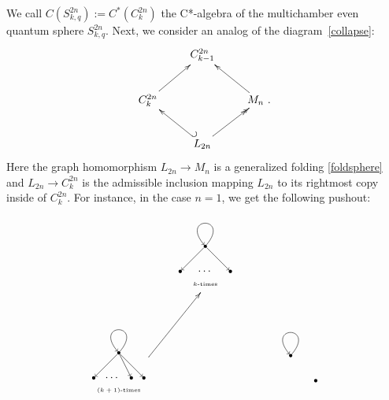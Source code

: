 \documentclass[12pt,times,a4paper]{amsart}
\numberwithin{equation}{section}
\numberwithin{equation}{section}
\begin{document}
\noindent We call $C(S^{2n}_{k,q}):=C^*(C^{2n}_k)$ the C*-algebra of the multichamber even quantum sphere $S^{2n}_{k,q}$. Next, we consider an analog of the diagram~\eqref{collapse}:
\begin{equation}
\xymatrix{
& C_{k-1}^{2n} &\\
C_k^{2n} \ar[ur] & & M_{n}~. \ar[ul]\\
& L_{2n} \ar@{>>}[ur] \ar@{_{(}->}[ul] &
}
\end{equation}
Here the graph homomorphism $L_{2n}\to M_n$ is a generalized folding \eqref{foldsphere} and $L_{2n}\to C^{2n}_k$ is the admissible inclusion mapping $L_{2n}$ to its rightmost copy inside of $C^{2n}_k$.
For instance, in the case $n=1$, we get the following pushout:
\begin{equation}
\begin{gathered}
\xymatrix{
&
\begin{tikzpicture}[scale=0.4,auto,swap]
\centering
\tikzstyle{vertex}=[circle,fill=black,minimum size=3pt,inner sep=0pt]
\tikzstyle{edge}=[draw,->]
    \node[vertex] (2) at (0,0) {};
    \node[vertex] (4) at (-2,-2) {};
    \node[vertex] (5) at (2,-2) {};
    \node (6) at (0,-2) {$\cdots$};
    \node (7) at (0,-3) {{\tiny $k$-times}};
    \path (2) edge [edge, anchor=center, loop above,min distance=20mm,in=130,out=50,looseness=40] node {} (2);
    \path (2) edge [edge] node {} (4);
    \path (2) edge [edge] node {} (5);
\end{tikzpicture}
&\\
\begin{tikzpicture}[scale=0.4,auto,swap]
\centering
\tikzstyle{vertex}=[circle,fill=black,minimum size=3pt,inner sep=0pt]
\tikzstyle{edge}=[draw,->]
    \node[vertex] (2) at (0,0) {};
    \node[vertex] (4) at (-2,-2) {};
    \node[vertex] (5) at (2,-2) {};
    \node (6) at (-0.5,-2) {$\cdots$};
    \node (7) at (0,-3) {{\tiny $(k+1)$-times}};
    \node[vertex] (8) at (1,-2) {};
    \path (2) edge [edge, anchor=center, loop above,min distance=20mm,in=130,out=50,looseness=40] node {} (2);
    \path (2) edge [edge] node {} (4);
    \path (2) edge [edge] node {} (5);
    \path (2) edge [edge] node {} (8);
\end{tikzpicture}
\ar[ur]& & 
\begin{tikzpicture}[scale=0.4,auto,swap]
\centering
\tikzstyle{vertex}=[circle,fill=black,minimum size=3pt,inner sep=0pt]
\tikzstyle{edge}=[draw,->]
    \node[vertex] (2) at (0,0) {};
    \node[vertex] (5) at (2,-2) {};
    \node (6) at (0,-3) {};
    \path (2) edge [edge, anchor=center, loop above,min distance=20mm,in=130,out=50,looseness=40] node {} (2);

\end{tikzpicture}}
\end{gathered}
\end{equation}
\end{document}

